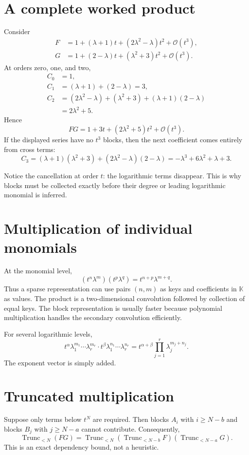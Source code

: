 \documentclass[11pt,openany]{book}
\theoremstyle{definition}
\theoremstyle{plain}
\theoremstyle{remark}
\newcommand{\K}{\mathbb{K}}
\newcommand{\bigO}{\mathcal{O}}
\DeclareMathOperator{\trunc}{Trunc}
\begin{document}
\section{A complete worked product}
Consider
\begin{align*}
 F&=1+(\lambda+1)t+(2\lambda^2-\lambda)t^2+\bigO(t^3),\\
 G&=1+(2-\lambda)t+(\lambda^2+3)t^2+\bigO(t^3).
\end{align*}
At orders zero, one, and two,
\begin{align*}
 C_0&=1,\\
 C_1&=(\lambda+1)+(2-\lambda)=3,\\
 C_2&=(2\lambda^2-\lambda)+(\lambda^2+3)
      +(\lambda+1)(2-\lambda)\\
 &=2\lambda^2+5.
\end{align*}
Hence
\begin{equation}\label{eq:worked-product}
 FG=1+3t+(2\lambda^2+5)t^2+\bigO(t^3).
\end{equation}
If the displayed series have no \(t^3\) blocks, then the next coefficient comes entirely from cross terms:
\[
 C_3=(\lambda+1)(\lambda^2+3)+(2\lambda^2-\lambda)(2-\lambda)
 =-\lambda^3+6\lambda^2+\lambda+3.
\]

Notice the cancellation at order \(t\): the logarithmic terms disappear. This is why blocks must be collected exactly before their degree or leading logarithmic monomial is inferred.

\section{Multiplication of individual monomials}
At the monomial level,
\begin{equation}\label{eq:monomial-product}
 (t^n\lambda^m)(t^p\lambda^q)=t^{n+p}\lambda^{m+q}.
\end{equation}
Thus a sparse representation can use pairs \((n,m)\) as keys and coefficients in \(\K\) as values. The product is a two-dimensional convolution followed by collection of equal keys. The block representation is usually faster because polynomial multiplication handles the secondary convolution efficiently.

For several logarithmic levels,
\[
 t^\alpha\lambda_1^{m_1}\cdots\lambda_r^{m_r}
 \cdot
 t^\beta\lambda_1^{n_1}\cdots\lambda_r^{n_r}
 =t^{\alpha+\beta}\prod_{j=1}^r\lambda_j^{m_j+n_j}.
\]
The exponent vector is simply added.

\section{Truncated multiplication}
Suppose only terms below \(t^N\) are required. Then blocks \(A_i\) with \(i\ge N-b\) and blocks \(B_j\) with \(j\ge N-a\) cannot contribute. Consequently,
\begin{equation}\label{eq:truncated-product}
 \trunc_{<N}(FG)
 =\trunc_{<N}\left(\trunc_{<N-b}F\right)
                   \left(\trunc_{<N-a}G\right).
\end{equation}
This is an exact dependency bound, not a heuristic.
\end{document}
